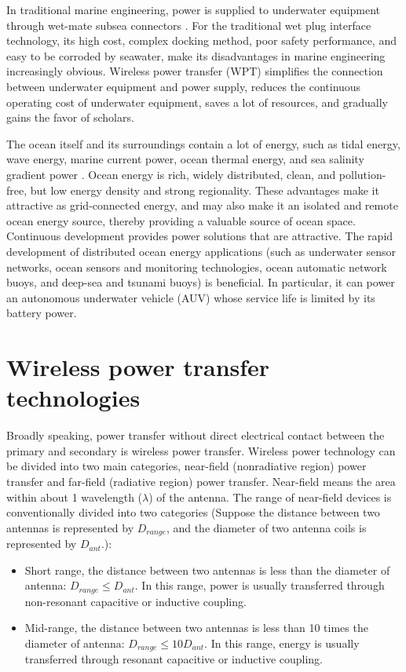 In traditional marine engineering, power is supplied to underwater equipment through wet-mate subsea connectors \cite{Wang2016}. For the traditional wet plug interface technology, its high cost, complex docking method, poor safety performance, and easy to be corroded by seawater, make its disadvantages in marine engineering increasingly obvious. Wireless power transfer (WPT) simplifies the connection between underwater equipment and power supply, reduces the continuous operating cost of underwater equipment, saves a lot of resources, and gradually gains the favor of scholars.

The ocean itself and its surroundings contain a lot of energy, such as tidal energy, wave energy, marine current power, ocean thermal energy, and sea salinity gradient power \cite{Capareda2019, Drew2009, Vlachogiannis2014, Zeng2020}. Ocean energy is rich, widely distributed, clean, and pollution-free, but low energy density and strong regionality. These advantages make it attractive as grid-connected energy, and may also make it an isolated and remote ocean energy source, thereby providing a valuable source of ocean space. Continuous development provides power solutions that are attractive. The rapid development of distributed ocean energy applications (such as underwater sensor networks, ocean sensors and monitoring technologies, ocean automatic network buoys, and deep-sea and tsunami buoys) is beneficial. In particular, it can power an autonomous underwater vehicle (AUV) whose service life is limited by its battery power.


\section{Wireless power transfer technologies}

Broadly speaking, power transfer without direct electrical contact between the primary and secondary is wireless power transfer. Wireless power technology can be divided into two main categories, near-field (nonradiative region) power transfer and far-field (radiative region) power transfer. 
Near-field means the area within about 1 wavelength ($\lambda$) of the antenna. The range of near-field devices is conventionally divided into two categories \cite{Wikipedia2021} (Suppose the distance between two antennas is represented by $D_{range}$, and the diameter of two antenna coils is represented by $D_{ant}$.):
\begin{itemize}
    \item  Short range, the distance between two antennas is less than the diameter of antenna: $D_{range} \leq D_{ant}$. In this range, power is usually transferred through non-resonant capacitive or inductive coupling.
    \item Mid-range, the distance between two antennas is less than 10 times the diameter of antenna:  $D_{range} \leq 10 D_{ant}$. In this range, energy is usually transferred through resonant capacitive or inductive coupling.
\end{itemize} 

